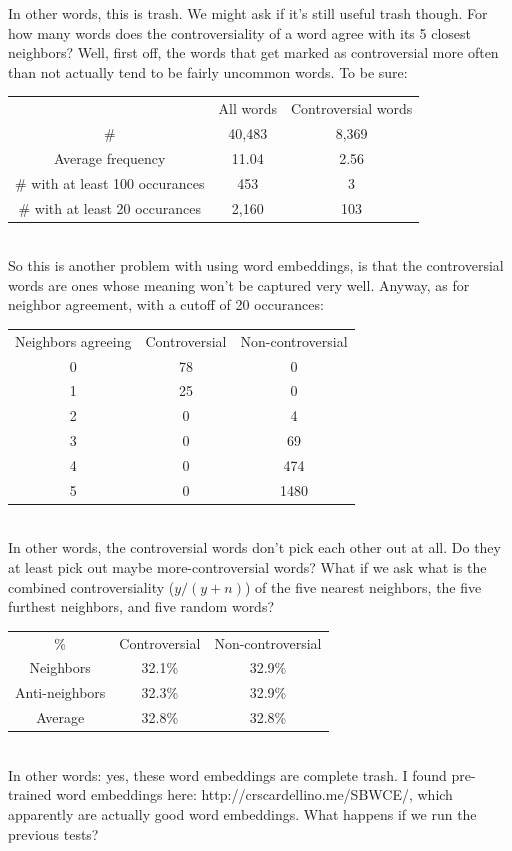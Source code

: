 \documentclass[11pt]{article} %
\begin{document}
In other words, this is trash. We might ask if it's still useful trash though. For how many words does the controversiality of a word agree with its 5 closest neighbors? Well, first off, the words that get marked as controversial more often than not actually tend to be fairly uncommon words. To be sure:
\\
\begin{tabular}{c|c|c}
\rowcolor{gray!50} & All words & Controversial words \\
\# & 40,483 & 8,369 \\
Average frequency & 11.04 & 2.56 \\
\# with at least 100 occurances & 453 & 3 \\
\# with at least 20 occurances & 2,160 & 103 \\\end{tabular}
\\
So this is another problem with using word embeddings, is that the controversial words are ones whose meaning won't be captured very well. Anyway, as for neighbor agreement, with a cutoff of 20 occurances: \\
\begin{tabular}{c|c|c}
\rowcolor{gray!50} Neighbors agreeing & Controversial & Non-controversial \\
0 & 78 & 0 \\
1 & 25 & 0 \\
2 & 0 & 4 \\
3 & 0 & 69 \\
4 & 0 & 474 \\
5 & 0 & 1480 \end{tabular}\\

In other words, the controversial words don't pick each other out at all. Do they at least pick out maybe more-controversial words? What if we ask what is the combined controversiality ($y/(y+n)$) of the five nearest neighbors, the five furthest neighbors, and five random words?

\begin{tabular}{c|c|c}
\rowcolor{gray!50}\%   & Controversial & Non-controversial \\
Neighbors & 32.1\% &  32.9\%\\
Anti-neighbors & 32.3\% & 32.9\% \\
Average & 32.8\% &  32.8\% \end{tabular}\\

In other words: yes, these word embeddings are complete trash. I found pre-trained word embeddings here: http://crscardellino.me/SBWCE/, which apparently are actually good word embeddings. What happens if we run the previous tests?\\
\end{document}
